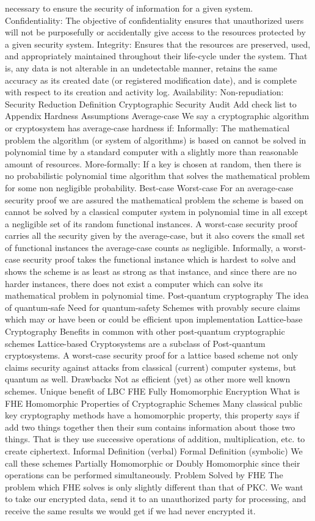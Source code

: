 necessary to ensure the security of information for a given system.
Confidentiality: The objective of confidentiality ensures that
unauthorized users will not be purposefully or accidentally give access
to the resources protected by a given security system. Integrity:
Ensures that the resources are preserved, used, and appropriately
maintained throughout their life-cycle under the system. That is, any
data is not alterable in an undetectable manner, retains the same
accuracy as its created date (or registered modification date), and is
complete with respect to its creation and activity log. Availability:
Non-repudiation: Security Reduction Definition Cryptographic Security
Audit Add check list to Appendix Hardness Assumptions Average-case We
say a cryptographic algorithm or cryptosystem has average-case hardness
if: Informally: The mathematical problem the algorithm (or system of
algorithms) is based on cannot be solved in polynomial time by a
standard computer with a slightly more than reasonable amount of
resources. More-formally: If a key is chosen at random, then there is
no probabilistic polynomial time algorithm that solves the mathematical
problem for some non negligible probability. Best-case Worst-case For
an average-case security proof we are assured the mathematical problem
the scheme is based on cannot be solved by a classical computer system
in polynomial time in all except a negligible set of its random
functional instances. A worst-case security proof carries all the
security given by the average-case, but it also covers the small set of
functional instances the average-case counts as negligible. Informally,
a worst-case security proof takes the functional instance which is
hardest to solve and shows the scheme is as least as strong as that
instance, and since there are no harder instances, there does not exist
a computer which can solve its mathematical problem in polynomial time.
Post-quantum cryptography The idea of quantum-safe Need for
quantum-safety Schemes with provably secure claims which may or have
been or could be efficient upon implementation Lattice-base
Cryptography Benefits in common with other post-quantum cryptographic
schemes Lattice-based Cryptosystems are a subclass of Post-quantum
cryptosystems. A worst-case security proof for a lattice based scheme
not only claims security against attacks from classical (current)
computer systems, but quantum as well. Drawbacks Not as efficient (yet)
as other more well known schemes. Unique benefit of LBC FHE Fully
Homomorphic Encryption What is FHE Homomorphic Properties of
Cryptographic Schemes Many classical public key cryptography methods
have a homomorphic property, this property says if add two things
together then their sum contains information about those two things.
That is they use successive operations of addition, multiplication,
etc. to create ciphertext. Informal Definition (verbal) Formal
Definition (symbolic) We call these schemes Partially Homomorphic or
Doubly Homomorphic since their operations can be performed
simultaneously. Problem Solved by FHE The problem which FHE solves is
only slightly different than that of PKC. We want to take our encrypted
data, send it to an unauthorized party for processing, and receive the
same results we would get if we had never encrypted it.

